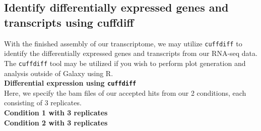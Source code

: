 \documentclass[a4paper,10pt]{article}
\begin{document}
\subsection{Identify differentially expressed genes and transcripts using cuffdiff}
With the finished assembly of our transcriptome, we may utilize \texttt{\footnotesize{cuffdiff}} to identify the differentially expressed genes and transcripts from our RNA-seq data.  The \texttt{\footnotesize{cuffdiff}} tool may be utilized if you wish to perform plot generation and analysis outside of Galaxy using R.\vspace{1em}\\
\textbf{Differential expression using \texttt{\footnotesize{cuffdiff}}}\vspace{1em}\\
\setlength\fboxsep{0pt}\vspace{1em}
Here, we specify the bam files of our accepted hits from our 2 conditions, each consisting of 3 replicates.\vspace{1em}\\
\textbf{Condition 1 with 3 replicates}\\
\setlength\fboxsep{0pt}\vspace{1em}
\textbf{Condition 2 with 3 replicates}\\
\end{document}
